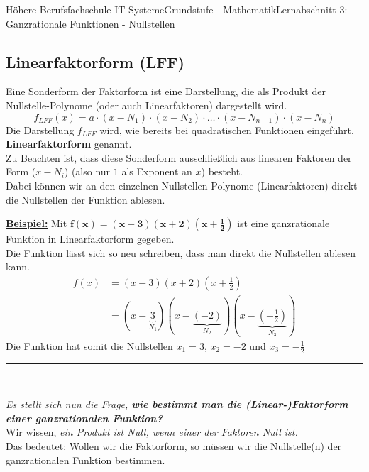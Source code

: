\documentclass[11pt,twocolumn,oneside,openany,headings=optiontotoc,11pt,numbers=noenddot]{article}
\begin{document}
\begin{worksheet}{Höhere Berufsfachschule IT-Systeme}{Grundstufe - Mathematik}{Lernabschnitt 3: Ganzrationale Funktionen - Nullstellen}
		\subsection*{Linearfaktorform (LFF)}
		Eine Sonderform der Faktorform ist eine Darstellung, die als Produkt der \grq{}Nullstelle-Polynome\grq{} (oder auch Linearfaktoren) dargestellt wird.
		\[f_{LFF}(x) = a\cdot{}(x-N_1)\cdot{}(x-N_2)\cdot{}\ldots{}\cdot{}(x-N_{n-1})\cdot{}(x-N_n)\]
		Die Darstellung \(f_{LFF}\) wird, wie bereits bei quadratischen Funktionen eingeführt, \textbf{Linearfaktorform} genannt.\\
		Zu Beachten ist, dass diese Sonderform ausschließlich aus linearen Faktoren der Form (\(x-N_i\)) (also nur \(1\) als Exponent an \(x\)) besteht.\\
		Dabei können wir an den einzelnen \grq{}Nullstellen-Polynome\grq{} (Linearfaktoren) direkt die Nullstellen der Funktion ablesen.\\
		\par\noindent
		\textbf{\underline{Beispiel:}} Mit \(\mathbf{f(x) = (x-3)(x+2)(x+\frac{1}{2})}\) ist eine ganzrationale Funktion in Linearfaktorform gegeben.\\
		Die Funktion lässt sich so \grq{}neu schreiben\grq{}, dass man direkt die Nullstellen ablesen kann.
		\begin{align*}
			f(x) & = (x-3)(x+2)(x+\frac{1}{2})\\  & = (x-\underbrace{3}_{N_1})(x-\underbrace{(-2)}_{N_2})(x-\underbrace{(-\frac{1}{2})}_{N_3})
		\end{align*}
		Die Funktion hat somit die Nullstellen \colorbox{green!10}{\(x_1=3\)}, \colorbox{green!10}{\(x_2 = -2\)} und \colorbox{green!10}{\(x_3 = -\frac{1}{2}\)}
		\par\noindent
		\rule{0.48\textwidth}{0.1pt}\\
		\par\noindent
		\textit{Es stellt sich nun die Frage, \textbf{wie bestimmt man die (Linear-)Faktorform einer ganzrationalen Funktion?}}\\
		Wir wissen, \textit{ein Produkt ist Null, wenn einer der Faktoren Null ist.}\\
		Das bedeutet: Wollen wir die Faktorform, so müssen wir die Nullstelle(n) der ganzrationalen Funktion bestimmen.

\end{worksheet}
\end{document}
